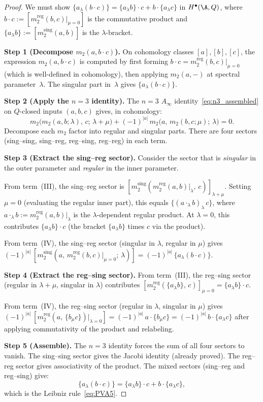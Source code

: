 \begin{proof}
We must show $\{a_\lambda (b\cdot c)\} = \{a_\lambda b\}\cdot c + b\cdot\{a_\lambda c\}$
in $H^\bullet(\A,Q)$, where $b\cdot c := [m_2^{\mathrm{reg}}(b,c)|_{\mu=0}]$ is the
commutative product and $\{a_\lambda b\} := [m_2^{\mathrm{sing}}(a,b)]$ is the
$\lambda$-bracket.

\textbf{Step 1 (Decompose $m_2(a, b\cdot c)$).}
On cohomology classes $[a],[b],[c]$, the expression $m_2(a, b\cdot c)$
is computed by first forming $b\cdot c = m_2^{\mathrm{reg}}(b,c)|_{\mu=0}$
(which is well-defined in cohomology), then applying $m_2(a,-)$ at
spectral parameter~$\lambda$. The singular part in~$\lambda$ gives
$\{a_\lambda (b\cdot c)\}$.

\textbf{Step 2 (Apply the $n=3$ identity).}
The $n=3$ $A_\infty$ identity~\eqref{eq:n3_assembled} on $Q$-closed inputs
$(a,b,c)$ gives, in cohomology:
\[
m_2\bigl(m_2(a,b;\lambda),\,c;\,\lambda{+}\mu\bigr)
+ (-1)^{|a|}\, m_2\bigl(a,\,m_2(b,c;\mu);\,\lambda\bigr)
= 0.
\]
Decompose each $m_2$ factor into regular and singular parts. There
are four sectors (sing--sing, sing--reg, reg--sing, reg--reg) in each term.

\textbf{Step 3 (Extract the sing--reg sector).}
Consider the sector that is \emph{singular} in the outer parameter
and \emph{regular} in the inner parameter.

From term~(III), the sing--reg sector is
$[m_2^{\mathrm{sing}}(m_2^{\mathrm{reg}}(a,b)|_{\lambda},\, c)]_{\lambda+\mu}$.
Setting $\mu=0$ (evaluating the regular inner part), this equals
$\{(a\cdot_\lambda b)_{\lambda}\, c\}$, where $a\cdot_\lambda b :=
m_2^{\mathrm{reg}}(a,b)|_\lambda$ is the $\lambda$-dependent regular product.
At $\lambda=0$, this contributes $\{a_\lambda b\}\cdot c$
(the bracket $\{a_\lambda b\}$ times $c$ via the product).

From term~(IV), the sing--reg sector (singular in $\lambda$,
regular in $\mu$) gives
$(-1)^{|a|}\,[m_2^{\mathrm{sing}}(a,\, m_2^{\mathrm{reg}}(b,c)|_{\mu=0};\,\lambda)]
= (-1)^{|a|}\, \{a_\lambda(b\cdot c)\}$.

\textbf{Step 4 (Extract the reg--sing sector).}
From term~(III), the reg--sing sector (regular in $\lambda+\mu$,
singular in $\lambda$) contributes
$[m_2^{\mathrm{reg}}(\{a_\lambda b\},\, c)]_{\mu=0} = \{a_\lambda b\}\cdot c$.

From term~(IV), the reg--sing sector (regular in $\lambda$,
singular in $\mu$) gives
$(-1)^{|a|}\, [m_2^{\mathrm{reg}}(a,\, \{b_\mu c\})|_{\lambda=0}]
= (-1)^{|a|}\, a\cdot\{b_\mu c\}
= (-1)^{|a|}\, b\cdot\{a_\lambda c\}$
after applying commutativity of the product and relabeling.

\textbf{Step 5 (Assemble).}
The $n=3$ identity forces the sum of all four sectors to vanish.
The sing--sing sector gives the Jacobi identity (already proved).
The reg--reg sector gives associativity of the product.
The mixed sectors (sing--reg and reg--sing) give:
\[
\{a_\lambda(b\cdot c)\} = \{a_\lambda b\}\cdot c + b\cdot\{a_\lambda c\},
\]
which is the Leibniz rule~\eqref{eq:PVA5}.
\end{proof}

